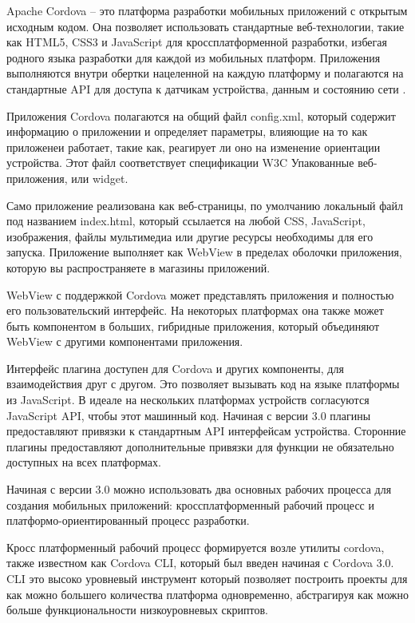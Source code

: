 Apache Cordova -- это платформа разработки мобильных приложений с открытым исходным кодом. Она позволяет использовать стандартные веб-технологии, такие как HTML5, CSS3 и JavaScript для кроссплатформенной разработки, избегая родного языка разработки для каждой из мобильных платформ. Приложения выполняются внутри обертки нацеленной на каждую платформу и полагаются на стандартные API для доступа к датчикам устройства, данным и состоянию сети \cite{cordova}.

Приложения Cordova полагаются на общий файл config.xml, который содержит информацию о приложении и определяет параметры, влияющие на то как приложенеи работает, такие как, реагирует ли оно на изменение ориентации устройства. Этот файл соответствует спецификации W3C Упакованные веб-приложения, или widget.

Само приложение реализована как веб-страницы, по умолчанию локальный файл под названием index.html, который ссылается на любой CSS, JavaScript, изображения, файлы мультимедиа или другие ресурсы необходимы для его запуска. Приложение выполняет как WebView в пределах оболочки приложения, которую вы распространяете в магазины приложений.

WebView с поддержкой Cordova может представлять приложения и полностью его пользовательский интерфейс. На некоторых платформах она также может быть компонентом в больших, гибридные приложения, который объединяют WebView с другими компонентами приложения.

Интерфейс плагина доступен для Cordova и других компоненты, для взаимодействия друг с другом. Это позволяет вызывать код на языке платформы из JavaScript. В идеале на нескольких платформах устройств согласуются JavaScript API, чтобы этот машинный код. Начиная с версии 3.0 плагины предоставляют привязки к стандартным API интерфейсам устройства. Сторонние плагины предоставляют дополнительные привязки для функции не обязательно доступных на всех платформах.

Начиная с версии 3.0 можно использовать два основных рабочих процесса для создания мобильных приложений: кроссплатформенный рабочий процесс и платформо-ориентированный процесс разработки. 

Кросс платформенный рабочий процесс формируется возле утилиты cordova, также известном как Cordova CLI, который был введен начиная с Cordova 3.0. CLI это высоко уровневый инструмент который позволяет построить проекты для как можно большего количества платформа одновременно, абстрагируя как можно больше функциональности низкоуровневых скриптов. 

